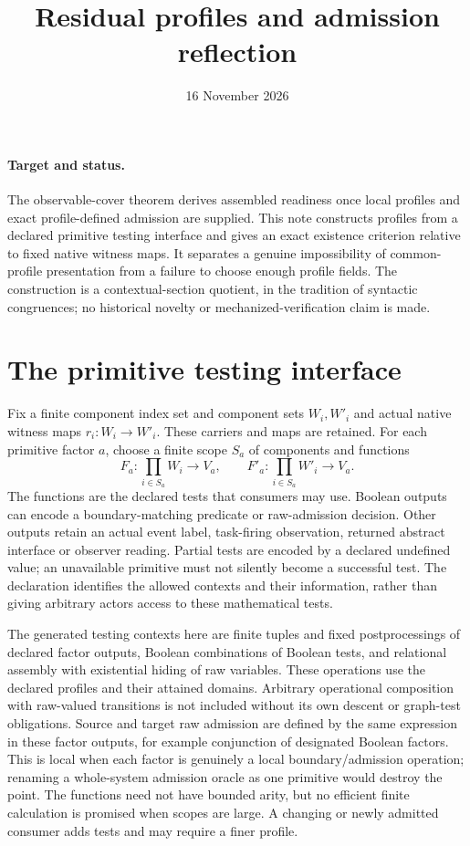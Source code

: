 \documentclass[11pt]{article}
\title{Residual profiles and admission reflection}
\author{}\date{16 November 2026}
\begin{document}
\maketitle
\paragraph{Target and status.} The observable-cover theorem derives assembled readiness once local profiles and exact profile-defined admission are supplied. This note constructs profiles from a declared primitive testing interface and gives an exact existence criterion relative to fixed native witness maps. It separates a genuine impossibility of common-profile presentation from a failure to choose enough profile fields. The construction is a contextual-section quotient, in the tradition of syntactic congruences; no historical novelty or mechanized-verification claim is made.

\section{The primitive testing interface}
Fix a finite component index set and component sets $W_i,W'_i$ and actual native witness maps $r_i:W_i\to W'_i$. These carriers and maps are retained. For each primitive factor $a$, choose a finite scope $S_a$ of components and functions
\[
 F_a:\prod_{i\in S_a}W_i\to V_a,\qquad
 F'_a:\prod_{i\in S_a}W'_i\to V_a.
\]
The functions are the declared tests that consumers may use. Boolean outputs can encode a boundary-matching predicate or raw-admission decision. Other outputs retain an actual event label, task-firing observation, returned abstract interface or observer reading. Partial tests are encoded by a declared undefined value; an unavailable primitive must not silently become a successful test. The declaration identifies the allowed contexts and their information, rather than giving arbitrary actors access to these mathematical tests.

The generated testing contexts here are finite tuples and fixed postprocessings of declared factor outputs, Boolean combinations of Boolean tests, and relational assembly with existential hiding of raw variables. These operations use the declared profiles and their attained domains. Arbitrary operational composition with raw-valued transitions is not included without its own descent or graph-test obligations. Source and target raw admission are defined by the same expression in these factor outputs, for example conjunction of designated Boolean factors. This is local when each factor is genuinely a local boundary/admission operation; renaming a whole-system admission oracle as one primitive would destroy the point. The functions need not have bounded arity, but no efficient finite calculation is promised when scopes are large. A changing or newly admitted consumer adds tests and may require a finer profile.
\end{document}

